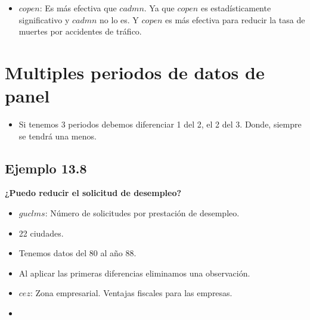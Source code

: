 \begin{itemize}
    \item $copen$: Es más efectiva que $cadmn$. Ya que $copen$ es estadísticamente significativo y $cadmn$ no lo es. Y $copen$ es más efectiva para reducir la tasa de muertes por accidentes de tráfico.
\end{itemize}


\section{Multiples periodos de datos de panel}

\begin{itemize}
    \item Si tenemos 3 periodos debemos diferenciar 1 del 2, el 2 del 3. Donde, siempre se tendrá una menos.
\end{itemize}

\subsection{Ejemplo 13.8}

\textbf{¿Puedo reducir el solicitud de desempleo?}

\begin{itemize}
    \item $guclms$: Número de solicitudes por prestación de desempleo.
    \item 22 ciudades.
    \item Tenemos datos del 80 al año 88.
    \item Al aplicar las primeras diferencias eliminamos una observación.
    \item $cez$: Zona empresarial. Ventajas fiscales para las empresas. 
\end{itemize}


\begin{itemize}
    \item 
\end{itemize}

